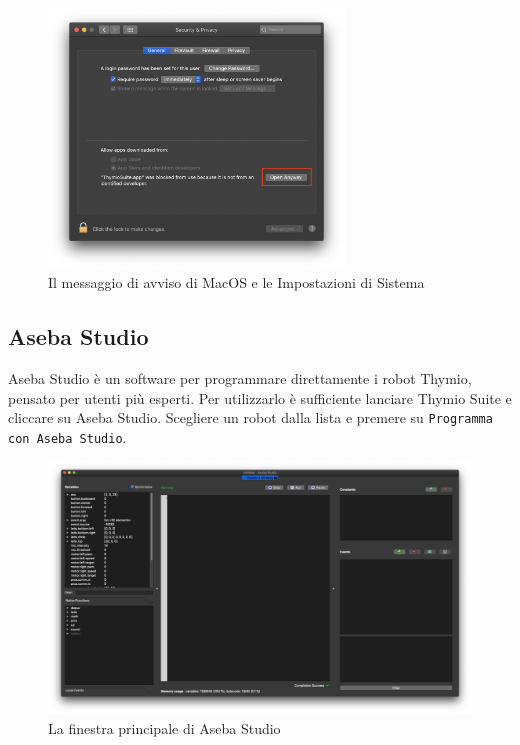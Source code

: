 \documentclass[12pt]{article}
\begin{document}
	\begin{figure}[H]
		\centering
			\includegraphics[width=0.7\textwidth]{img/macWarn2.png}
			\caption{Il messaggio di avviso di MacOS e le Impostazioni di Sistema}
			\label{macErr}
	\end{figure}
		
	\subsection{Aseba Studio}
	
		Aseba Studio è un software per programmare direttamente i robot Thymio, pensato per utenti più esperti. Per utilizzarlo è sufficiente lanciare Thymio Suite e cliccare su Aseba Studio. Scegliere un robot dalla lista e premere su \texttt{Programma con Aseba Studio}.
		
		\begin{figure}[H]
			\includegraphics[width=\textwidth]{img/asebaStudio.png}
			\caption{La finestra principale di Aseba Studio}
			\label{aseba1}
		\end{figure}		
\end{document}
